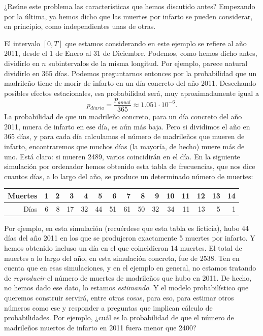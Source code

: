 \begin{ejemplo}
¿Reúne este problema las características que hemos discutido antes? Empezando por la última, ya
hemos dicho que  las muertes por infarto se pueden considerar, en principio, como independientes
unas de otras.

El intervalo $[0,T]$ que estamos considerando en este ejemplo se refiere al año 2011, desde el 1 de
Enero al 31 de Diciembre. Podemos, como hemos dicho antes, dividirlo en $n$ subintervalos de la
misma longitud. Por ejemplo, parece natural dividirlo en 365 días. Podemos preguntarnos entonces
por la probabilidad que un madrileño tiene de morir de infarto en un día concreto del año 2011.
Desechando posibles efectos estacionales, esa probabilidad será, muy aproximadamente igual a
\[p_{diaria}=\dfrac{p_{anual}}{365}\approx 1.051\cdot 10^{-6}.\]
La probabilidad de que un madrileño concreto, para un día concreto del año 2011, muera de infarto
en ese día, es aún más baja. Pero si dividimos el año en 365 días, y para cada día calculamos el
número de madrileños que mueren de infarto, encontraremos que muchos días (la mayoría, de hecho)
muere más de uno. Está claro: si mueren 2489, varios coincidirán en el día. En la siguiente
simulación por ordenador hemos obtenido esta tabla de frecuencias, que nos dice cuantos días, a lo
largo del año, se produce un determinado número de muertes:
\begin{table}[ht]
\centering
{\small
    \begin{tabular}{rrrrrrrrrrrrrrr}
      \hline
        Muertes &1 & 2 & 3 & 4 & 5 & 6 & 7 & 8 & 9 & 10 & 11 & 12 & 13 & 14 \\
      \hline
        Días &   6 &   8 &  17 &  32 &  44 &  51 &  61 &  50 &  32 &  34 &  11 &  13 &   5 &   1 \\
      \hline
    \end{tabular}
}
\end{table}
Por ejemplo, en esta simulación (recuérdese que esta tabla es ficticia), hubo 44 días del año 2011
en los que se produjeron exactamente 5 muertes por infarto. Y hemos obtenido incluso un día en el
que coincidieron 14 muertes. El total de muertes a lo largo del año, en esta simulación concreta,
fue de 2538. Ten en cuenta que en esas simulaciones, y en el ejemplo en general, no estamos
tratando de {\em reproducir} el número de muertes de madrileños que hubo en 2011. De hecho, no
hemos dado ese dato, lo estamos {\em estimando}. Y el modelo probabilístico que queremos construir
servirá, entre otras cosas, para eso, para estimar otros números como ese y responder a preguntas
que implican cálculo de probabilidades. Por ejemplo, ¿cuál es la probabilidad de que el número de
madrileños muertos de infarto en 2011 fuera menor que 2400?


\end{ejemplo}
